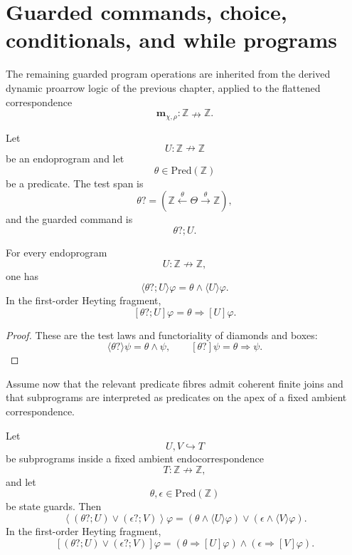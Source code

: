 \section{Guarded commands, choice, conditionals, and while programs}
\label{sec:derived-poly-guarded-program-algebra}

The remaining guarded program operations are inherited from the derived
dynamic proarrow logic of the previous chapter, applied to the flattened
correspondence
\[
\mathbf m_{\chi,\rho}:\mathbb Z\nrightarrow\mathbb Z.
\]

Let
\[
U:\mathbb Z\nrightarrow\mathbb Z
\]
be an endoprogram and let
\[
\theta\in\mathrm{Pred}(\mathbb Z)
\]
be a predicate.  The test span is
\[
\theta?
=
\left(
\mathbb Z\xleftarrow{\theta}\Theta\xrightarrow{\theta}\mathbb Z
\right),
\]
and the guarded command is
\[
\theta?;U.
\]

\begin{proposition}
\label{prop:derived-poly-guard-prefix-laws}
For every endoprogram
\[
U:\mathbb Z\nrightarrow\mathbb Z,
\]
one has
\[
\langle\theta?;U\rangle\varphi
=
\theta\wedge\langle U\rangle\varphi.
\]
In the first-order Heyting fragment,
\[
[\theta?;U]\varphi
=
\theta\Rightarrow[U]\varphi.
\]
\end{proposition}

\begin{proof}
These are the test laws and functoriality of diamonds and boxes:
\[
\langle\theta?\rangle\psi=\theta\wedge\psi,
\qquad
[\theta?]\psi=\theta\Rightarrow\psi.
\]
\end{proof}

Assume now that the relevant predicate fibres admit coherent finite joins and
that subprograms are interpreted as predicates on the apex of a fixed ambient
correspondence.

\begin{proposition}
\label{prop:derived-poly-finite-guarded-choice}
Let
\[
U,V\hookrightarrow T
\]
be subprograms inside a fixed ambient endocorrespondence
\[
T:\mathbb Z\nrightarrow\mathbb Z,
\]
and let
\[
\theta,\epsilon\in\mathrm{Pred}(\mathbb Z)
\]
be state guards.  Then
\[
\left\langle
(\theta?;U)\vee(\epsilon?;V)
\right\rangle\varphi
=
(\theta\wedge\langle U\rangle\varphi)
\vee
(\epsilon\wedge\langle V\rangle\varphi).
\]
In the first-order Heyting fragment,
\[
\left[
(\theta?;U)\vee(\epsilon?;V)
\right]\varphi
=
(\theta\Rightarrow[U]\varphi)
\wedge
(\epsilon\Rightarrow[V]\varphi).
\]
\end{proposition}


